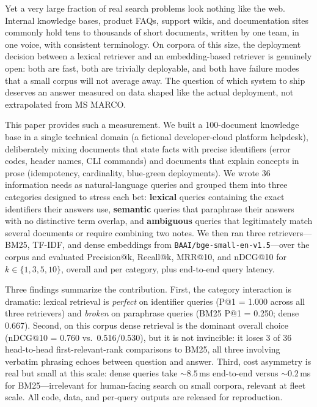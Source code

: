 \documentclass[11pt,a4paper]{article}
\newcommand{\code}[1]{\texttt{#1}}
\begin{document}
Yet a very large fraction of real search problems look nothing like the web. Internal knowledge bases, product FAQs, support wikis, and documentation sites commonly hold tens to thousands of short documents, written by one team, in one voice, with consistent terminology. On corpora of this size, the deployment decision between a lexical retriever and an embedding-based retriever is genuinely open: both are fast, both are trivially deployable, and both have failure modes that a small corpus will not average away. The question of which system to ship deserves an answer measured on data shaped like the actual deployment, not extrapolated from MS MARCO.

This paper provides such a measurement. We built a 100-document knowledge base in a single technical domain (a fictional developer-cloud platform helpdesk), deliberately mixing documents that state facts with precise identifiers (error codes, header names, CLI commands) and documents that explain concepts in prose (idempotency, cardinality, blue-green deployments). We wrote 36 information needs as natural-language queries and grouped them into three categories designed to stress each bet: \textbf{lexical} queries containing the exact identifiers their answers use, \textbf{semantic} queries that paraphrase their answers with no distinctive term overlap, and \textbf{ambiguous} queries that legitimately match several documents or require combining two notes. We then ran three retrievers---BM25, TF-IDF, and dense embeddings from \code{BAAI/bge-small-en-v1.5}---over the corpus and evaluated Precision@k, Recall@k, MRR@10, and nDCG@10 for $k \in \{1, 3, 5, 10\}$, overall and per category, plus end-to-end query latency.

Three findings summarize the contribution. First, the category interaction is dramatic: lexical retrieval is \emph{perfect} on identifier queries (P@1 = 1.000 across all three retrievers) and \emph{broken} on paraphrase queries (BM25 P@1 = 0.250; dense 0.667). Second, on this corpus dense retrieval is the dominant overall choice (nDCG@10 = 0.760 vs.\ 0.516/0.530), but it is not invincible: it loses 3 of 36 head-to-head first-relevant-rank comparisons to BM25, all three involving verbatim phrasing echoes between question and answer. Third, cost asymmetry is real but small at this scale: dense queries take ${\sim}8.5$\,ms end-to-end versus ${\sim}0.2$\,ms for BM25---irrelevant for human-facing search on small corpora, relevant at fleet scale. All code, data, and per-query outputs are released for reproduction.
\end{document}
